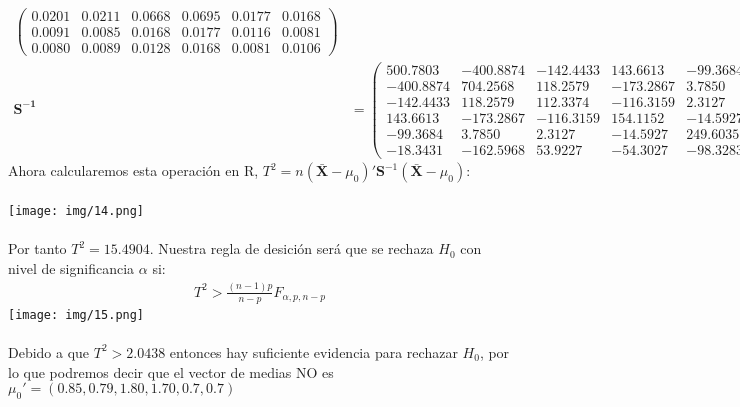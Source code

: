 \begin{sol}
\begin{itemize}
\begin{align*}
\begin{pmatrix}
        0.0201 & 0.0211 & 0.0668 & 0.0695 & 0.0177 & 0.0168 \\
        0.0091 & 0.0085 & 0.0168 & 0.0177 & 0.0116 & 0.0081 \\
        0.0080 & 0.0089 & 0.0128 & 0.0168 & 0.0081 & 0.0106
    \end{pmatrix} \\
    \mathbf{S^{-1}} &= \begin{pmatrix}
        500.7803 & -400.8874 & -142.4433 & 143.6613 & -99.3684 & -18.3431 \\
        -400.8874 & 704.2568 & 118.2579 & -173.2867 & 3.7850 & -162.5968 \\
        -142.4433 & 118.2579 & 112.3374 & -116.3159 & 2.3127 & 53.9227 \\
        143.6613 & -173.2867 & -116.3159 & 154.1152 & -14.5927 & -54.3027 \\
        -99.3684 & 3.7850 & 2.3127 & -14.5927 & 249.6035 & -98.3283 \\
        -18.3431 & -162.5968 & 53.9227 & -54.3027 & -98.3283 & 340.3370
    \end{pmatrix}
\end{align*}
Ahora calcularemos esta operación en R, $T^2=n(\bar{\mathbf{X}} - \mu_0)'\mathbf{S}^{-1}(\mathbf{\bar{X}}-\mu_0)$: \\\\
\texttt{[image: img/14.png]}\\\\
Por tanto $T^2 = 15.4904$. Nuestra regla de desición será que se rechaza $H_0$ con nivel de significancia $\alpha$ si:
\begin{align*}
T^2 > \frac{(n-1)p}{n-p}F_{\alpha,p,n-p}
\end{align*}
\texttt{[image: img/15.png]}\\\\
Debido a que $T^2>2.0438$ entonces hay suficiente evidencia para rechazar $H_0$, por lo que podremos decir que el vector de medias NO es  $\mu_0'=(0.85,0.79,1.80,1.70,0.7,0.7)$ \pagebreak


\end{itemize}
\end{sol}
